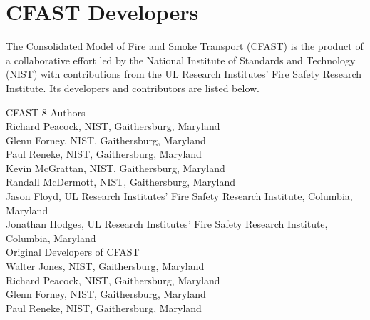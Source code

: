 
\chapter{CFAST Developers}

The Consolidated Model of Fire and Smoke Transport (CFAST) is the product of a collaborative effort led by
the National Institute of Standards and Technology (NIST) with contributions from the UL Research Institutes' Fire Safety Research Institute. Its developers and contributors are listed below.

\vspace{0.3in}

\begin{flushleft}

CFAST 8 Authors \\ [0.2in]

Richard Peacock, NIST, Gaithersburg, Maryland \\
Glenn Forney, NIST, Gaithersburg, Maryland \\
Paul Reneke, NIST, Gaithersburg, Maryland \\
Kevin McGrattan, NIST, Gaithersburg, Maryland \\
Randall McDermott, NIST, Gaithersburg, Maryland \\
Jason Floyd, UL Research Institutes' Fire Safety Research Institute, Columbia, Maryland \\
Jonathan Hodges, UL Research Institutes' Fire Safety Research Institute, Columbia, Maryland \\ [0.3in]

Original Developers of CFAST \\ [0.2in]

Walter Jones, NIST, Gaithersburg, Maryland \\
Richard Peacock, NIST, Gaithersburg, Maryland \\
Glenn Forney, NIST, Gaithersburg, Maryland \\
Paul Reneke, NIST, Gaithersburg, Maryland

\end{flushleft}
